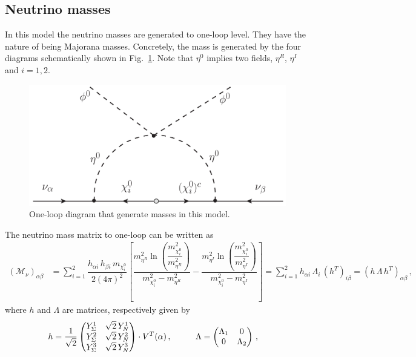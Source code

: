 \documentclass[12pt,letterpaper]{article}
\begin{document}
   






\subsection{Neutrino masses}
\label{sec:neutrino-masses}

In this model the neutrino masses are generated to one-loop level. They have the nature of being Majorana masses. Concretely, the mass is generated by the four diagrams schematically shown in Fig.~\ref{fig:mass-diagram}. Note that $\eta^0$ implies two fields, $\eta^R$, $\eta^I$ and $i=1,2$.
%
\begin{figure}
\begin{center}
\includegraphics[scale=0.4]{mass-diagram}
\caption{One-loop diagram that generate masses in this model. }
\label{fig:mass-diagram}
\end{center}
\end{figure}
%
The neutrino mass matrix to one-loop can be written as
%
\begin{align}
\label{eq:Mv-mass-matrix}
(\mathcal{M}_\nu)_{\alpha\beta} &= \sum_{i=1}^2\dfrac{h_{\alpha i}\,h_{\beta i}\,m_{\chi_i^0}}{2(4\pi)^2}
\left[
\dfrac{m_{\eta^R}^2\ln\left(\dfrac{m_{\chi_i^0}^2}{m_{\eta^R}^2}\right)}{m_{\chi_i^0}^2-m_{\eta^R}^2}
-\dfrac{m_{\eta^I}^2\ln\left(\dfrac{m_{\chi_i^0}^2}{m_{\eta^I}^2}\right)}{m_{\chi_i^0}^2-m_{\eta^I}^2}
\right] = \sum_{i=1}^2h_{\alpha i}\,\Lambda_i\,(h^T)_{i\beta}
=(h\,\Lambda\,h^T)_{\alpha\beta}\,,
\end{align}
%
where $h$ and $\Lambda$ are matrices, respectively given by
%
\begin{align}
\label{eq:h-Lambda-matrices}
h &= \dfrac{1}{\sqrt{2}}
\begin{pmatrix}
Y_{\Sigma}^1 & \sqrt{2}\,Y_N^1 \\
Y_{\Sigma}^2 & \sqrt{2}\,Y_N^2 \\
Y_{\Sigma}^3 & \sqrt{2}\,Y_N^3
\end{pmatrix}
\cdot V^{T}(\alpha)\,,
\hspace{1 cm}
\Lambda=
\begin{pmatrix}
\Lambda_1 & 0 \\
0 & \Lambda_2
\end{pmatrix}\,,
\end{align}
\end{document}
